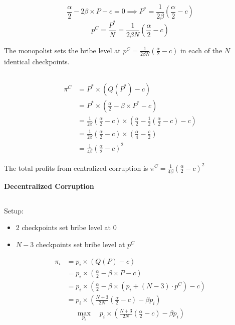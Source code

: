 \documentclass[a4paper]{article}
\begin{document}
\begin{equation*}
    \frac{\alpha}{2}-2\beta\times P-c=0\implies P^{*}=\frac{1}{2\beta}\left(\frac{\alpha}{2}-c\right)
\end{equation*}
\begin{equation*}
    p^C=\frac{P^*}{N}=\frac{1}{2\beta N}\left(\frac{\alpha}{2}-c\right)
\end{equation*}

The monopolist sets the bribe level at $p^C=\frac{1}{2\beta N}\left(\frac{\alpha}{2}-c\right)$ in each of the $N$ identical checkpoints.

\subsection{}

\begin{align*}
    \pi^C&=P^*\times (Q(P^*)-c) \\
    &=P^*\times\left(\frac{\alpha}{2}-\beta\times P^*-c\right) \\
    &=\frac{1}{2\beta}\left(\frac{\alpha}{2}-c\right)\times
    \left(\frac{\alpha}{2}-\frac{1}{2}\left(\frac{\alpha}{2}-c\right)-c\right) \\
    &=\frac{1}{2\beta}\left(\frac{\alpha}{2}-c\right)\times\left(\frac{\alpha}{4}-\frac{c}{2}\right) \\
    &=\frac{1}{4\beta}\left(\frac{\alpha}{2}-c\right)^2
\end{align*}

The total profits from centralized corruption is $\pi^C=\frac{1}{4\beta}\left(\frac{\alpha}{2}-c\right)^2$ 

\textbf{Decentralized Corruption}

\subsection{}
Setup:
\begin{itemize}
    \item 2 checkpoints set bribe level at 0
    \item $N-3$ checkpoints set bribe level at $p^C$
\end{itemize}
\begin{align*}
    \pi_i&=p_i\times (Q(P)-c) \\
    &=p_i\times\left(\frac{\alpha}{2}-\beta\times P-c \right) \\
    &=p_i\times\left(\frac{\alpha}{2}-\beta\times\left(p_i + (N-3)\cdot p^C\right)-c \right) \\
    &=p_i\times\left(\frac{N+3}{2N}\left(\frac{\alpha}{2}-c\right)-\beta p_i \right) 
\end{align*}
\begin{align*}
    \max_{p_i}\quad p_i\times\left(\frac{N+3}{2N}\left(\frac{\alpha}{2}-c\right)-\beta p_i \right) 
\end{align*}
\end{document}
